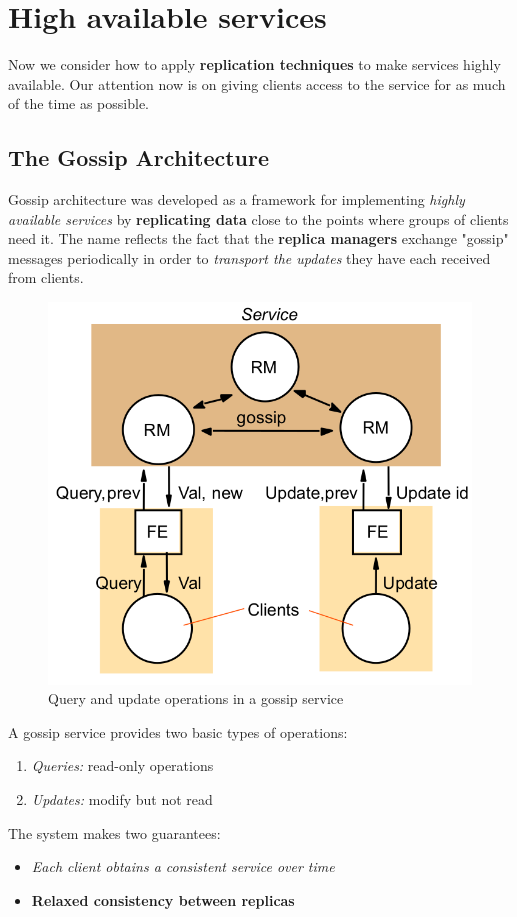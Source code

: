 \section{High available services}
Now we consider how to apply \textbf{replication techniques} to make services highly available. Our attention now is on giving clients access to the service for as much of the time as possible.

\subsection{The Gossip Architecture}
Gossip architecture was developed as a framework for implementing \textit{highly available services} by \textbf{replicating data} close to the points where groups of clients need it. The name reflects the fact that the \textbf{replica managers} exchange "gossip" messages periodically in order to \textit{transport the updates} they have each received from clients.

\begin{figure}[!h]
    \centering
    \includegraphics[width=.60\linewidth]{images/roleGroupCommunication/GossipService.png}
    \caption{Query and update operations in a gossip service}
\end{figure}

A gossip service provides two basic types of operations:
\begin{enumerate}
    \item \textit{Queries:} read-only operations
    \item \textit{Updates:} modify but not read
\end{enumerate}
The system makes two guarantees:
\begin{itemize}
    \item \textit{Each client obtains a consistent service over time}
    \item \textbf{Relaxed consistency between replicas}
\end{itemize}

